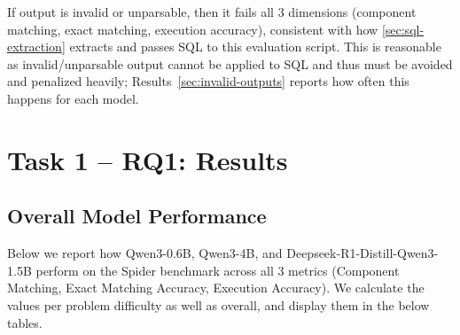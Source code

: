 If output is invalid or unparsable, then it fails all 3 dimensions (component matching, exact matching, execution accuracy), consistent with how \ref{sec:sql-extraction} extracts and passes SQL to this evaluation script. This is reasonable as invalid/unparsable output cannot be applied to SQL and thus must be avoided and penalized heavily; Results~\ref{sec:invalid-outputs} reports how often this happens for each model.

\section{Task 1 -- RQ1: Results}
\label{sec:rq1-results}

\subsection{Overall Model Performance}
\label{sec:overall-performance}

Below we report how Qwen3-0.6B, Qwen3-4B, and Deepseek-R1-Distill-Qwen3-1.5B perform on the Spider benchmark across all 3 metrics (Component Matching, Exact Matching Accuracy, Execution Accuracy). We calculate the values per problem difficulty as well as overall, and display them in the below tables.

\begin{table}[H]
\centering
\footnotesize
\caption{Overall performance summary, aggregated across all difficulties (all 1034 problems). Component matching is accuracy / recall / F1 (macro-averaged, see the note on table~\ref{tab:difficulty-component} in \ref{sec:rq1-interpretation}). Per-difficulty breakdowns are in Tables~\ref{tab:difficulty-component}--\ref{tab:difficulty-execution}.}
\label{tab:overall-performance}
\end{table}


